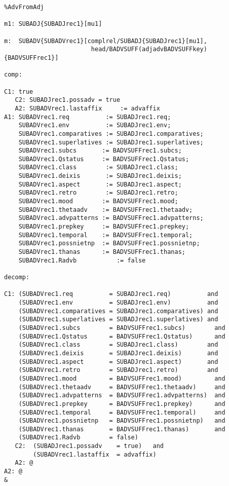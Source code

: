 \begin{verbatim}
%AdvFromAdj

m1: SUBADJ{SUBADJrec1}[mu1]

m:  SUBADV{SUBADVrec1}[complrel/SUBADJ{SUBADJrec1}[mu1], 
                        head/BADVSUFF(adjadvBADVSUFFkey){BADVSUFFrec1}]

comp:

C1: true
   C2: SUBADJrec1.possadv = true
   A2: SUBADVrec1.lastaffix     := advaffix
A1: SUBADVrec1.req          := SUBADJrec1.req;  
    SUBADVrec1.env          := SUBADJrec1.env;  
    SUBADVrec1.comparatives := SUBADJrec1.comparatives;
    SUBADVrec1.superlatives := SUBADJrec1.superlatives;
    SUBADVrec1.subcs       := BADVSUFFrec1.subcs;    
    SUBADVrec1.Qstatus     := BADVSUFFrec1.Qstatus;  
    SUBADVrec1.class        := SUBADJrec1.class;
    SUBADVrec1.deixis       := SUBADJrec1.deixis;
    SUBADVrec1.aspect       := SUBADJrec1.aspect;
    SUBADVrec1.retro        := SUBADJrec1.retro;
    SUBADVrec1.mood        := BADVSUFFrec1.mood;    
    SUBADVrec1.thetaadv    := BADVSUFFrec1.thetaadv;    
    SUBADVrec1.advpatterns := BADVSUFFrec1.advpatterns;    
    SUBADVrec1.prepkey     := BADVSUFFrec1.prepkey;    
    SUBADVrec1.temporal    := BADVSUFFrec1.temporal;
    SUBADVrec1.possnietnp  := BADVSUFFrec1.possnietnp;    
    SUBADVrec1.thanas      := BADVSUFFrec1.thanas;    
    SUBADVrec1.Radvb           := false

decomp:

C1: (SUBADVrec1.req          = SUBADJrec1.req)          and
    (SUBADVrec1.env          = SUBADJrec1.env)          and
    (SUBADVrec1.comparatives = SUBADJrec1.comparatives) and
    (SUBADVrec1.superlatives = SUBADJrec1.superlatives) and
    (SUBADVrec1.subcs        = BADVSUFFrec1.subcs)        and
    (SUBADVrec1.Qstatus      = BADVSUFFrec1.Qstatus)      and
    (SUBADVrec1.class        = SUBADJrec1.class)        and
    (SUBADVrec1.deixis       = SUBADJrec1.deixis)       and
    (SUBADVrec1.aspect       = SUBADJrec1.aspect)       and
    (SUBADVrec1.retro        = SUBADJrec1.retro)        and
    (SUBADVrec1.mood         = BADVSUFFrec1.mood)         and
    (SUBADVrec1.thetaadv     = BADVSUFFrec1.thetaadv)     and
    (SUBADVrec1.advpatterns  = BADVSUFFrec1.advpatterns)  and
    (SUBADVrec1.prepkey      = BADVSUFFrec1.prepkey)      and
    (SUBADVrec1.temporal     = BADVSUFFrec1.temporal)     and
    (SUBADVrec1.possnietnp   = BADVSUFFrec1.possnietnp)   and
    (SUBADVrec1.thanas       = BADVSUFFrec1.thanas)       and
    (SUBADVrec1.Radvb        = false)  
   C2:  (SUBADJrec1.possadv    = true)   and
        (SUBADVrec1.lastaffix  = advaffix)                  
   A2: @
A2: @
&
\end{verbatim}
\newpage
